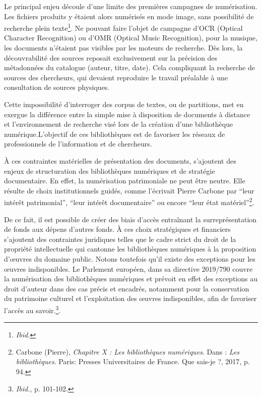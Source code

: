 Le principal enjeu découle d’une limite des premières campagnes de numérisation. Les fichiers produits y étaient alors numérisés en mode image, sans possibilité de recherche plein texte\footnote{\textit{Ibid.}}. Ne pouvant faire l’objet de campagne d’OCR (Optical Character Recognition) ou d’OMR (Optical Music Recognition), pour la musique, les documents n’étaient pas visibles par les moteurs de recherche. Dès lors, la découvrabilité des sources reposait exclusivement sur la précision des métadonnées du catalogue (auteur, titre, date). Cela compliquant la recherche de sources des chercheurs, qui devaient reproduire le travail préalable à une consultation de sources physiques.

Cette impossibilité d’interroger des corpus de textes, ou de partitions, met en exergue la différence entre la simple mise à disposition de documents à distance et l’environnement de recherche visé lors de la création d’une bibliothèque numérique.L’objectif de ces bibliothèques est de favoriser les réseaux de professionnels de l’information et de chercheurs. 

À ces contraintes matérielles de présentation des documents, s’ajoutent des enjeux de structuration des bibliothèques numériques et de stratégie documentaire. En effet, la numérisation patrimoniale ne peut être neutre. Elle résulte de choix institutionnels guidés, comme l’écrivait Pierre Carbone par \enquote{leur intérêt patrimonial}, \enquote{leur intérêt documentaire} ou encore \enquote{leur état matériel}\footnote{Carbone (Pierre), \textit{Chapitre X : Les bibliothèques numériques}. Dans : \textit{Les bibliothèques}. Paris: Presses Universitaires de France. Que sais-je ?, 2017, p. 94.}.

De ce fait, il est possible de créer des biais d’accès entraînant la surreprésentation de fonds aux dépens d’autres fonds. À ces choix stratégiques et financiers s’ajoutent des contraintes juridiques telles que le cadre strict du droit de la propriété intellectuelle qui cantonne les bibliothèques numériques à la proposition d'œuvres du domaine public. Notons toutefois qu’il existe des exceptions pour les œuvres indisponibles. Le Parlement européen, dans sa directive 2019/790 couvre la numérisation des bibliothèques numériques et prévoit en effet des exceptions au droit d’auteur dans des cas précis et encadrés, notamment pour la conservation du patrimoine culturel et l'exploitation des œuvres indisponibles, afin de favoriser l'accès au savoir.\footnote{\textit{Ibid.}, p. 101-102.}.


